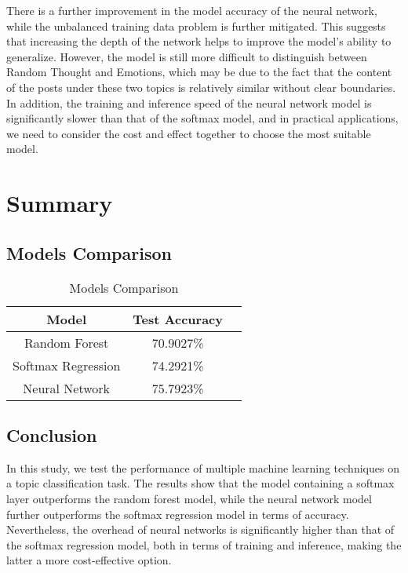 \documentclass[a4paper, twocolumn]{article}
\begin{document}
There is a further improvement in the model accuracy of the neural network, while the unbalanced training data problem is further mitigated. This suggests that increasing the depth of the network helps to improve the model's ability to generalize. However, the model is still more difficult to distinguish between Random Thought and Emotions, which may be due to the fact that the content of the posts under these two topics is relatively similar without clear boundaries. In addition, the training and inference speed of the neural network model is significantly slower than that of the softmax model, and in practical applications, we need to consider the cost and effect together to choose the most suitable model.

\section{Summary}

\subsection{Models Comparison}

\begin{table}[H]
\centering
\begin{tabular}{|c|c|c|}
\hline
\textbf{Model} & \textbf{Test Accuracy} \\ \hline
Random Forest&70.9027\%\\ \hline
Softmax Regression&74.2921\%\\ \hline
Neural Network&75.7923\%\\ \hline
\end{tabular}
\caption{Models Comparison}
\end{table}

\subsection{Conclusion}

In this study, we test the performance of multiple machine learning techniques on a topic classification task. The results show that the model containing a softmax layer outperforms the random forest model, while the neural network model further outperforms the softmax regression model in terms of accuracy. Nevertheless, the overhead of neural networks is significantly higher than that of the softmax regression model, both in terms of training and inference, making the latter a more cost-effective option.
\end{document}
